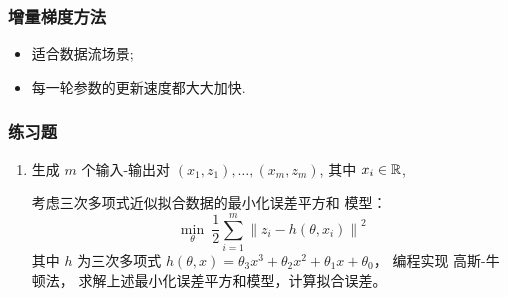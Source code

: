 \documentclass[11pt]{beamer}
\begin{document}

\begin{frame}
\frametitle{增量梯度方法}
\begin{itemize}
	\item %
          适合数据流场景;

	\item %
每一轮参数的更新速度都大大加快.
\end{itemize}
\end{frame}

 
\begin{frame}
		\frametitle{练习题}
		
		
		
		\begin{enumerate}
			
			\item {} 生成 $m$ 个输入-输出对 $\left(x_{1}, z_{1}\right), \ldots,\left(x_{m}, z_{m}\right)$, 其中 $x_i \in \mathbb{R}$, 
			
			考虑三次多项式近似拟合数据的最小化误差平方和 模型： 
		\begin{equation}
			\min_{\theta} \ \frac{1}{2} \sum_{i=1}^{m}\left\|z_{i}-h\left(\theta, x_{i}\right)\right\|^{2}
	\end{equation}
			其中 $h$ 为三次多项式 
			$
			h(\theta, x)=\theta_{3} x^{3}+\theta_{2} x^{2}+\theta_{1} x+\theta_{0}
			$，			
			编程实现 高斯-牛顿法， 求解上述最小化误差平方和模型，计算拟合误差。
			 
		\end{enumerate}
		
\end{frame}
	
 
\end{document}
